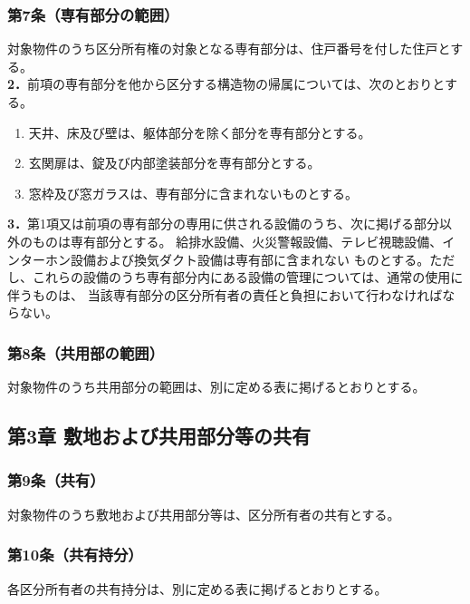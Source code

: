 \documentclass[
  luatex,
  paper=a4paper,
  fontsize=11pt,
  jafontsize=11pt,
  jlreq_notes,
]{jlreq}
\begin{document}
  \subsubsection*{ 第7条（専有部分の範囲）}
  対象物件のうち区分所有権の対象となる専有部分は、住戸番号を付した住戸とする。\\
  \textbf{2．}前項の専有部分を他から区分する構造物の帰属については、次のとおりとする。
  \begin{enumerate}
    \item 天井、床及び壁は、躯体部分を除く部分を専有部分とする。
    \item 玄関扉は、錠及び内部塗装部分を専有部分とする。
    \item 窓枠及び窓ガラスは、専有部分に含まれないものとする。 
  \end{enumerate}
  \textbf{3．}第1項又は前項の専有部分の専用に供される設備のうち、次に掲げる部分以外のものは専有部分とする。
  給排水設備、火災警報設備、テレビ視聴設備、インターホン設備および換気ダクト設備は専有部に含まれない
  ものとする。ただし、これらの設備のうち専有部分内にある設備の管理については、通常の使用に伴うものは、
  当該専有部分の区分所有者の責任と負担において行わなければならない。

  \subsubsection*{第8条（共用部の範囲）}
  対象物件のうち共用部分の範囲は、別に定める表に掲げるとおりとする。
  
  \begin{center}
    \subsection*{第3章 敷地および共用部分等の共有}
  \end{center}

  \subsubsection*{第9条（共有）}
  対象物件のうち敷地および共用部分等は、区分所有者の共有とする。

  \subsubsection*{第10条（共有持分）}
  各区分所有者の共有持分は、別に定める表に掲げるとおりとする。
\end{document}
